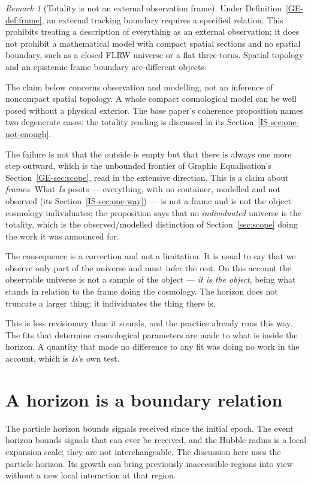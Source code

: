 \documentclass[11pt,a4paper]{article}
\theoremstyle{remark}\newtheorem{remark}[definition]{Remark}
\begin{document}
\begin{remark}[Totality is not an external observation frame]\label{prop:totality}
Under Definition~\ref{GE-def:frame}, an external tracking boundary requires
a specified relation. This prohibits treating a description of everything as
an external observation; it does not prohibit a mathematical model with
compact spatial sections and no spatial boundary, such as a closed FLRW
universe or a flat three-torus. Spatial topology and an epistemic frame boundary
are different objects.
\end{remark}
The claim below concerns observation and modelling, not an inference of
noncompact spatial topology. A whole compact cosmological model can be
well posed without a physical exterior. The base paper's coherence
proposition names two degenerate cases; the totality reading is discussed
in its Section~\ref{IS-sec:one-not-enough}.



The failure is not that the outside is empty but that there is always one more step outward, which is
the unbounded frontier of Graphic Equalisation's Section~\ref{GE-sec:scope}, read in the extensive
direction. This is a claim about \emph{frames}. What \emph{Is} posits --- everything, with no container, modelled
and not observed (its Section~\ref{IS-sec:one-way}) --- is not a frame and is not the object cosmology
individuates; the proposition says that no \emph{individuated} universe is the totality, which is the
observed/modelled distinction of Section~\ref{sec:scope} doing the work it was announced for.

The consequence is a correction and not a limitation. It is usual to say that we observe only
part of the universe and must infer the rest. On this account the observable universe is not a sample of
the object --- \emph{it is the object}, being what stands in relation to the frame doing the
cosmology. The horizon does not truncate a larger thing; it individuates the thing there is.

This is less revisionary than it sounds, and the practice already runs this way. The fits that
determine cosmological parameters are made to what is inside the horizon. A quantity that made no
difference to any fit was doing no work in the account, which is \emph{Is}'s own test.

\section{A horizon is a boundary relation}\label{sec:horizon}
The particle horizon bounds signals received since the initial epoch. The
event horizon bounds signals that can ever be received, and the Hubble radius
is a local expansion scale; they are not interchangeable. The discussion
here uses the particle horizon. Its growth can bring previously inaccessible
regions into view without a new local interaction at that region.
\end{document}
